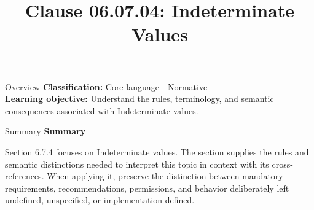 \documentclass[10pt,letterpaper]{article}
\title{Clause 06.07.04: Indeterminate Values}
\author{}
\date{}
\begin{document}
\maketitle
\begin{CornellOverviewBox}{Overview}
\textbf{Classification:} Core language - Normative\\[2pt]
\textbf{Learning objective:} Understand the rules, terminology, and semantic consequences associated with Indeterminate values.
\end{CornellOverviewBox}\begin{CornellSummaryBox}{Summary}
{\sffamily\bfseries\color{Accent} Summary}\par\vspace{3pt}Section 6.7.4 focuses on Indeterminate values. The section supplies the rules and semantic distinctions needed to interpret this topic in context with its cross-references. When applying it, preserve the distinction between mandatory requirements, recommendations, permissions, and behavior deliberately left undefined, unspecified, or implementation-defined.
\end{CornellSummaryBox}
\end{document}
